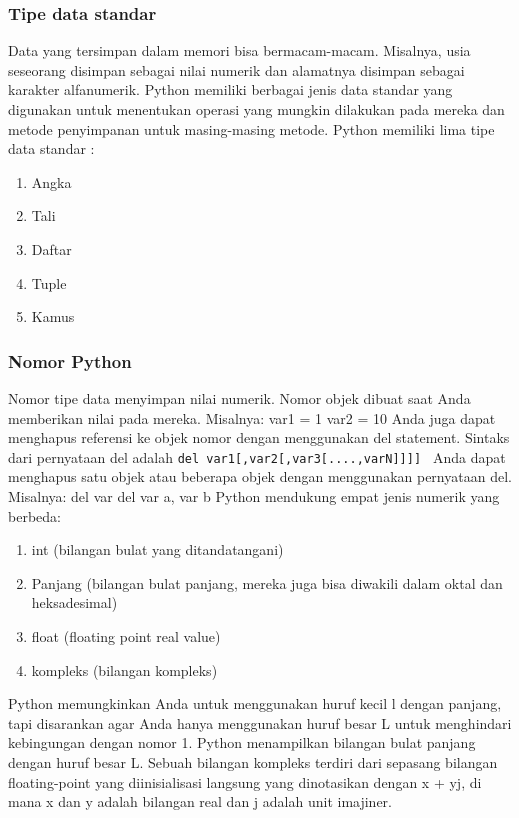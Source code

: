 \subsubsection{Tipe data standar}
	Data yang tersimpan dalam memori bisa bermacam-macam. Misalnya, usia seseorang disimpan sebagai nilai numerik dan alamatnya disimpan sebagai karakter alfanumerik. Python memiliki berbagai jenis data standar yang digunakan untuk menentukan operasi yang mungkin dilakukan pada mereka dan metode penyimpanan untuk masing-masing metode.
Python memiliki lima tipe data standar :
\begin{enumerate}
	\item Angka
	\item Tali
	\item Daftar
	\item Tuple
	\item Kamus
\end{enumerate}

\subsubsection{Nomor Python}
Nomor tipe data menyimpan nilai numerik. Nomor objek dibuat saat Anda memberikan nilai pada mereka. 
Misalnya: 
	var1 = 1 
	var2 = 10 
Anda juga dapat menghapus referensi ke objek nomor dengan menggunakan del statement. Sintaks dari pernyataan del adalah 
\verb|del var1[,var2[,var3[....,varN]]]] |
Anda dapat menghapus satu objek atau beberapa objek dengan menggunakan pernyataan del. 
Misalnya:
	del var 
	del var a, var b 
Python mendukung empat jenis numerik yang berbeda:
\begin{enumerate}
	\item int (bilangan bulat yang ditandatangani) 
	\item Panjang (bilangan bulat panjang, mereka juga bisa diwakili dalam oktal dan heksadesimal) 
	\item float (floating point real value)
	\item kompleks (bilangan kompleks) 
\end{enumerate}
Python memungkinkan Anda untuk menggunakan huruf kecil l dengan panjang, tapi disarankan agar Anda hanya menggunakan huruf besar L untuk menghindari kebingungan dengan nomor 1.  
Python menampilkan bilangan bulat panjang dengan huruf besar L.
Sebuah bilangan kompleks terdiri dari sepasang bilangan floating-point yang diinisialisasi langsung yang dinotasikan dengan x + yj, di mana x dan y adalah bilangan real dan j adalah unit imajiner. 

